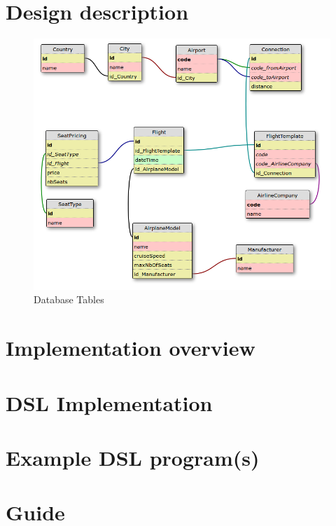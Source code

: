 \documentclass[a4paper]{article}
\begin{document}
\section{Design description}
\label{sec:design-description}


\begin{figure}[ht!]
  \includegraphics[width=1.0\textwidth]{../analysis/dbtables-diagram.png}
  \caption{Database Tables}\label{fig:database-tables}
\end{figure}



\section{Implementation overview}
\label{sec:implementation-overview}


\section{DSL Implementation}
\label{sec:dsl-implementation}


\section{Example DSL program(s)}
\label{sec:example-dsl-programs}


\section{Guide}
\label{sec:guide}

\end{document}
